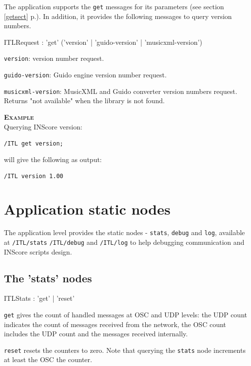 \documentclass[a4paper,twoside]{report}
\newcommand{\sublevel}[1]	{\section{#1}}
\newcommand{\subsublevel}[1]	{\subsection{#1}}
\newcommand{\fullref}[1]	{\ref{#1} p.\pageref{#1}}
\newcommand{\OSC}[1]		{\texttt{#1}}
\newcommand{\example}		{\textbf{\hspace{-1.5cm}\textbf{\textsc{Example }}}}
\let\olditemize\itemize
\let\oldenditemize\enditemize
\renewenvironment{itemize} 	{\olditemize \setlength{\itemsep}{1mm}}{\oldenditemize}
\newcommand{\sample}	[1]			{\vspace{-2mm}\begin{center}\colorbox{mygrey}{
								\begin{minipage}[t]{0.9\columnwidth} 
								{\small \texttt{#1}}
								\end{minipage}}\end{center}}
\newcommand{\sampleindent}	{ \hspace{0.5cm} }
\begin{document}
The application supports the \OSC{get} messages for its parameters (see section \fullref{getsect}). In addition, it provides the following messages to query version numbers.

\begin{rail}
ITLRequest : 'get'  ('version' | 'guido-version' | 'musicxml-version')
\end{rail}

\begin{itemize}
\item \OSC{version}: version number request.
\item \OSC{guido-version}: Guido engine version number request.
\item \OSC{musicxml-version}: MusicXML and Guido converter version numbers request. Returns "not available" when the library is not found.

\end{itemize}

\example \\
Querying INScore version:
\sample{/ITL get version;}
\sampleindent will give the following as output:
\sample{/ITL version 1.00}

\sublevel{Application static nodes}
\label{ITLStatic}

The application level provides the static nodes - \OSC{stats}, \OSC{debug} and \OSC{log}, available at \OSC{/ITL/stats} \OSC{/ITL/debug} and \OSC{/ITL/log}  to help debugging communication and INScore scripts design.

\subsublevel{The 'stats' nodes}
\label{ITLstat}

\begin{rail}
ITLStats : 'get'  | 'reset'
\end{rail}

\begin{itemize}
\item \OSC{get} gives the count of handled messages at OSC and UDP levels: the UDP count indicates the count of messages received from the network, the OSC count includes the UDP count and the messages received internally.
\item \OSC{reset} resets the counters to zero. Note that querying the \OSC{stats} node increments at least the OSC the counter.
\end{itemize}
\end{document}
